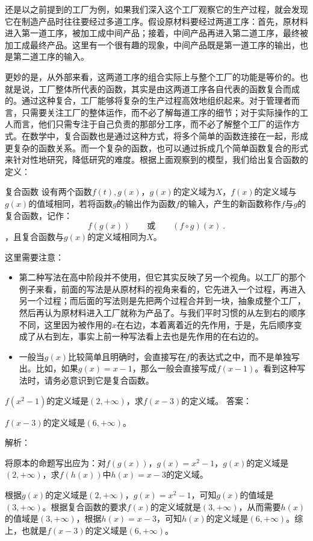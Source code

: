 还是以之前提到的工厂为例，如果我们深入这个工厂观察它的生产过程，就会发现它在制造产品时往往要经过多道工序。假设原材料要经过两道工序：首先，原材料进入第一道工序，被加工成中间产品；接着，中间产品再进入第二道工序，最终被加工成最终产品。这里有一个很有趣的现象，中间产品既是第一道工序的输出，也是第二道工序的输入。

更妙的是，从外部来看，这两道工序的组合实际上与整个工厂的功能是等价的。也就是说，工厂整体所代表的函数，其实是由这两道工序各自代表的函数复合而成的。通过这种复合，工厂能够将复杂的生产过程高效地组织起来。对于管理者而言，只需要关注工厂的整体运作，而不必了解每道工序的细节；对于实际操作的工人而言，他们只需专注于自己负责的那部分工序，而不必了解整个工厂的运作方式。在数学中，复合函数也是通过这种方式，将多个简单的函数连接在一起，形成更复杂的函数关系。而一个复杂的函数，也可以通过拆成几个简单函数复合的形式来针对性地研究，降低研究的难度。根据上面观察到的模型，我们给出复合函数的定义：

\begin{definition}{复合函数}
设有两个函数$f(t),g(x)$，$g(x)$的定义域为$X$，$f(x)$的定义域与$g(x)$的值域相同，若将函数$g$的输出作为函数$f$的输入，产生的新函数称作$f$与$g$的复合函数，记作：
\begin{equation}
f(g(x))\qquad\text{或}\qquad(f \circ g)(x)~.
\end{equation}
，且复合函数与$g(x)$的定义域相同为$X$。
\end{definition}

这里需要注意：
\begin{itemize}
\item 第二种写法在高中阶段并不使用，但它其实反映了另一个视角。以工厂的那个例子来看，前面的写法是从原材料的视角来看的，它先进入一个过程，再进入另一个过程；而后面的写法则是先把两个过程合并到一块，抽象成整个工厂，然后再认为原材料进入工厂就称为产品了。与我们平时习惯的从左到右的顺序不同，这里因为被作用的$x$在右边，本着离着近的先作用，于是，先后顺序变成了从右到左，事实上前一种写法看上去也是先作用的在右边的。
\item 一般当$g(x)$比较简单且明确时，会直接写在$f$的表达式之中，而不是单独写出。比如，如果$g(x)=x-1$，那么一般会直接写成$f(x-1)$。看到这种写法时，请务必意识到它是复合函数。
\end{itemize}

\begin{exercise}{$f(x^2-1)$的定义域是$(2,+\infty)$，求$f(x-3)$的定义域。}
答案：

$f(x-3)$的定义域是$(6,+\infty)$。

解析：

将原本的命题写出应为：对$f(g(x))$，$g(x)=x^2-1$，$g(x)$的定义域是$(2,+\infty)$，求$f(h(x))$中$h(x)=x-3$的定义域。

根据$g(x)$的定义域是$(2,+\infty)$，$g(x)=x^2-1$，可知$g(x)$的值域是$(3,+\infty)$。根据复合函数的要求$f(x)$的定义域就是$(3,+\infty)$，从而需要$h(x)$的值域是$(3,+\infty)$，根据$h(x)=x-3$，可知$h(x)$的定义域是$(6,+\infty)$。综上，也就是$f(x-3)$的定义域是$(6,+\infty)$。

\end{exercise}

